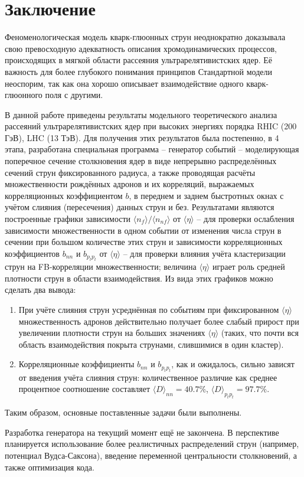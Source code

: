 \section{Заключение}
Феноменологическая модель кварк-глюонных струн неоднократно доказывала свою превосходную адекватность описания хромодинамических процессов, происходящих в мягкой области рассеяния ультрарелятивистских ядер. Её важность для более глубокого понимания принципов Стандартной модели неоспорим, так как она хорошо описывает взаимодействие одного кварк-глюонного поля с другими. 

В данной работе приведены результаты модельного теоретического анализа рассеяний ультрарелятивистских ядер при высоких энергиях порядка RHIC (200 ГэВ), LHC (13 ТэВ). Для получения этих результатов была постепенно, в 4 этапа, разработана специальная программа -- генератор событий -- моделирующая поперечное сечение столкновения ядер в виде непрерывно распределённых сечений струн фиксированного радиуса, а также проводящая расчёты множественности рождённых адронов и их корреляций, выражаемых корреляционных коэффициентом $b$, в переднем и заднем быстротных окнах с учётом слияния (пересечения) данных струн и без. Результатами являются построенные графики зависимости $\langle n_{f} \rangle / \langle n_{nf} \rangle$ от $\langle \eta \rangle$ -- для проверки ослабления зависимости множественности в одном событии от изменения числа струн в сечении при большом количестве этих струн и зависимости корреляционных коэффициентов $b_{nn}$ и $b_{p_tp_t}$ от $\langle \eta \rangle$ -- для проверки влияния учёта кластеризации струн на FB-корреляции множественности; величина $\langle \eta \rangle$ играет роль средней плотности струн в области взаимодействия. Из вида этих графиков можно сделать два вывода: 
\begin{enumerate}[label=\arabic*.]
\item	При учёте слияния струн усреднённая по событиям при фиксированном $\langle \eta \rangle$ множественность адронов действительно получает более слабый прирост при увеличении плотности струн на больших значениях $\langle \eta \rangle$ (таких, что почти вся область взаимодействия покрыта струнами, слившимися в один кластер).
\item	Корреляционные коэффициенты $b_{nn}$ и $b_{p_tp_t}$, как и ожидалось, сильно зависят от введения учёта слияния струн: количественное различие как среднее процентное соотношение составляет $\langle D \rangle _{nn} = 40.7 \%$, $\langle D \rangle _{p_tp_t} = 97.7 \%$. 
\end{enumerate}
Таким образом, основные поставленные задачи были выполнены.

Разработка генератора на текущий момент ещё не закончена. В перспективе планируется использование более реалистичных распределений струн (например, потенциал Вудса-Саксона), введение переменной центральности столкновений, а также оптимизация кода.